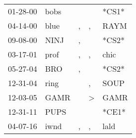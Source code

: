 \begin{supertabular}{p{0.07\textwidth}p{0.06\textwidth}p{0.02\textwidth}p{0.02\textwidth}p{0.06\textwidth}}
 01-28-00\textsuperscript{} &  bobs\textsuperscript{} &    &               &                   *CS1* \\
 04-14-00\textsuperscript{} &  blue\textsuperscript{} &  , &             , &  RAYM\textsuperscript{} \\
 09-08-00\textsuperscript{} &  NINJ\textsuperscript{} &  , &               &                   *CS2* \\
 03-17-01\textsuperscript{} &  prof\textsuperscript{} &  , &             , &  chic\textsuperscript{} \\
 05-27-04\textsuperscript{} &   BRO\textsuperscript{} &  , &               &                   *CS2* \\
 12-31-04\textsuperscript{} &  ring\textsuperscript{} &    &             , &  SOUP\textsuperscript{} \\
 12-03-05\textsuperscript{} &  GAMR\textsuperscript{} &    &  \textgreater &  GAMR\textsuperscript{} \\
 12-31-11\textsuperscript{} &  PUPS\textsuperscript{} &    &               &                   *CE1* \\
 04-07-16\textsuperscript{} &  iwnd\textsuperscript{} &  , &             , &  lald\textsuperscript{} \\
\end{supertabular}

